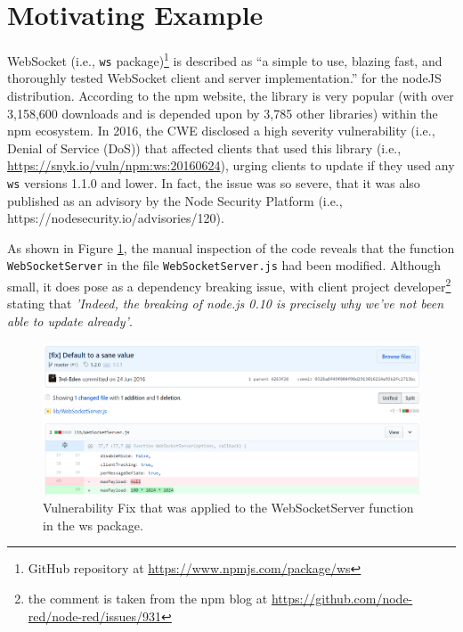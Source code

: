 \section{Motivating Example}



WebSocket (i.e., \texttt{ws} package)\footnote{GitHub repository at \url{https://www.npmjs.com/package/ws}} is described as ``a simple to use, blazing fast, and thoroughly tested WebSocket client and server implementation.'' for the nodeJS distribution.
According to the npm website, the library is very popular (with over 3,158,600 downloads and is  depended upon by 3,785 other libraries) within the npm ecosystem.
In 2016, the CWE disclosed a high severity vulnerability (i.e., Denial of Service (DoS)) that affected clients that used this library (i.e.,  \url{https://snyk.io/vuln/npm:ws:20160624}), urging clients to update if they used any \texttt{ws} versions 1.1.0 and lower.
In fact, the issue was so severe, that it was also published as an advisory by the Node Security Platform (i.e., https://nodesecurity.io/advisories/120).

As shown in Figure \ref{fig:codeWS}, the manual inspection of the code reveals that the function \texttt{WebSocketServer} in the file \texttt{WebSocketServer.js} had been modified.
Although small, it does pose as a dependency breaking issue, with client project developer\footnote{the comment is taken from the npm blog at \url{https://github.com/node-red/node-red/issues/931}} stating that \textit{'Indeed, the breaking of node.js 0.10 is precisely why we've not been able to update already'}. 

\begin{figure}[th]
\centering
\includegraphics[width=1\textwidth]{images/codeWS.PNG}
\caption{Vulnerability Fix that was applied to the WebSocketServer function in the ws package.}
\label{fig:codeWS}
   \end{figure}


